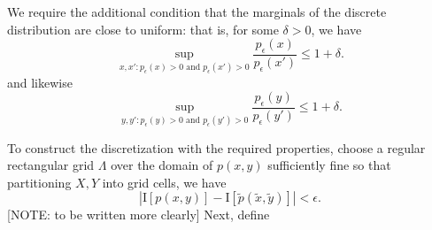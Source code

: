 \documentclass[12pt]{article}
\begin{document}
We require the additional condition that the marginals of the discrete distribution are close to uniform: that is, for some $\delta > 0$, we have
\[
\sup_{x, x': p_\epsilon(x) > 0\text{ and }p_\epsilon(x') > 0} \frac{p_\epsilon(x)}{p_\epsilon(x')} \leq 1 + \delta.
\]
and likewise
\[
\sup_{y, y': p_\epsilon(y) > 0\text{ and }p_\epsilon(y') > 0} \frac{p_\epsilon(y)}{p_\epsilon(y')} \leq 1 + \delta.
\]

To construct the discretization with the required properties, choose a regular rectangular grid $\Lambda$ over the domain of $p(x,y)$
sufficiently fine so that partitioning $X,Y$ into grid cells, we have
\[
|\text{I}[p(x,y)] - \text{I}[\tilde{p}(\tilde{x}, \tilde{y})]| < \epsilon.
\]
[NOTE: to be written more clearly]
Next, define 
\end{document}
